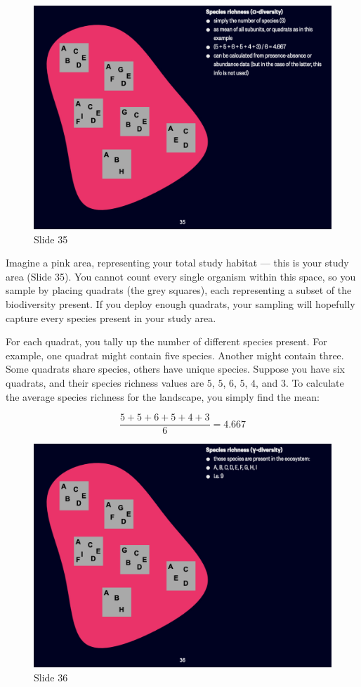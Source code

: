 \documentclass[
  11pt,
]{book}
\begin{document}
\begin{figure}[ht]
\centering
\includegraphics[width=0.8\linewidth]{../images/BDC334/BDC334-035.jpeg}
\caption*{Slide 35}
\end{figure}

Imagine a pink area, representing your total study habitat --- this is
your study area (Slide 35). You cannot count every single organism
within this space, so you sample by placing quadrats (the grey squares),
each representing a subset of the biodiversity present. If you deploy
enough quadrats, your sampling will hopefully capture every species
present in your study area.

For each quadrat, you tally up the number of different species present.
For example, one quadrat might contain five species. Another might
contain three. Some quadrats share species, others have unique species.
Suppose you have six quadrats, and their species richness values are
\(5\), \(5\), \(6\), \(5\), \(4\), and \(3\). To calculate the average
species richness for the landscape, you simply find the mean:

\[
\frac{5 + 5 + 6 + 5 + 4 + 3}{6} = 4.667
\]

\begin{figure}[ht]
\centering
\includegraphics[width=0.8\linewidth]{../images/BDC334/BDC334-036.jpeg}
\caption*{Slide 36}
\end{figure}
\end{document}
